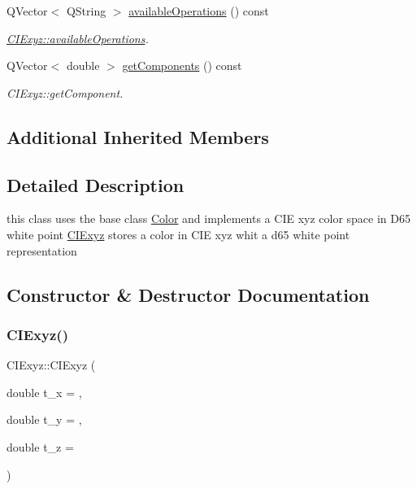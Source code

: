 \begin{DoxyCompactItemize}
Q\+Vector$<$ Q\+String $>$ \hyperlink{class_c_i_exyz_aa82a27c78ff425e06cdd740dd50e93b1}{available\+Operations} () const
\begin{DoxyCompactList}\small\item\em \hyperlink{class_c_i_exyz_aa82a27c78ff425e06cdd740dd50e93b1}{C\+I\+Exyz\+::available\+Operations}. \end{DoxyCompactList}\item 
Q\+Vector$<$ double $>$ \hyperlink{class_c_i_exyz_af8992e3ac1741c35fcb18aa2cdb554a0}{get\+Components} () const
\begin{DoxyCompactList}\small\item\em C\+I\+Exyz\+::get\+Component. \end{DoxyCompactList}\end{DoxyCompactItemize}
\subsection*{Additional Inherited Members}


\subsection{Detailed Description}
this class uses the base class \hyperlink{class_color}{Color} and implements a C\+IE xyz color space in D65 white point \hyperlink{class_c_i_exyz}{C\+I\+Exyz} stores a color in C\+IE xyz whit a d65 white point representation 

\subsection{Constructor \& Destructor Documentation}
\mbox{\label{class_c_i_exyz_aea8a8b567ac89a96b0bf4c749a49ea90}} 
\subsubsection{\texorpdfstring{C\+I\+Exyz()}{CIExyz()}\hspace{0.1cm}{\footnotesize\ttfamily [1/3]}}
{\footnotesize\ttfamily C\+I\+Exyz\+::\+C\+I\+Exyz (\begin{DoxyParamCaption}\item[{double}]{t\+\_\+x = {},  }\item[{double}]{t\+\_\+y = {},  }\item[{double}]{t\+\_\+z = {} }\end{DoxyParamCaption})}



